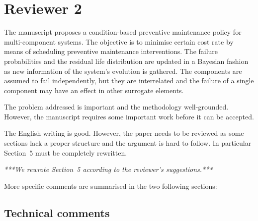 \documentclass[authoryear]{elsarticle}
\begin{document}
\section*{Reviewer 2}

The manuscript proposes a condition-based preventive maintenance policy for multi-component systems. The objective is to minimise certain cost rate by means of scheduling preventive maintenance interventions. The failure probabilities and the residual life distribution are updated in a Bayesian fashion as new information of the system’s evolution is gathered. The components are assumed to fail independently, but they are interrelated and the failure of a single component may have an effect in other surrogate elements.

The problem addressed is important and the methodology well-grounded. However, the manuscript requires some important work before it can be accepted.

The English writing is good. However, the paper needs to be reviewed as some sections lack a proper structure and the argument is hard to follow. In particular Section~5 must be completely rewritten.

\smallskip

\emph{***We rewrote Section~5 according to the reviewer's suggestions.***}

\smallskip

More specific comments are summarised in the two following sections:

\subsection*{Technical comments}
\end{document}
